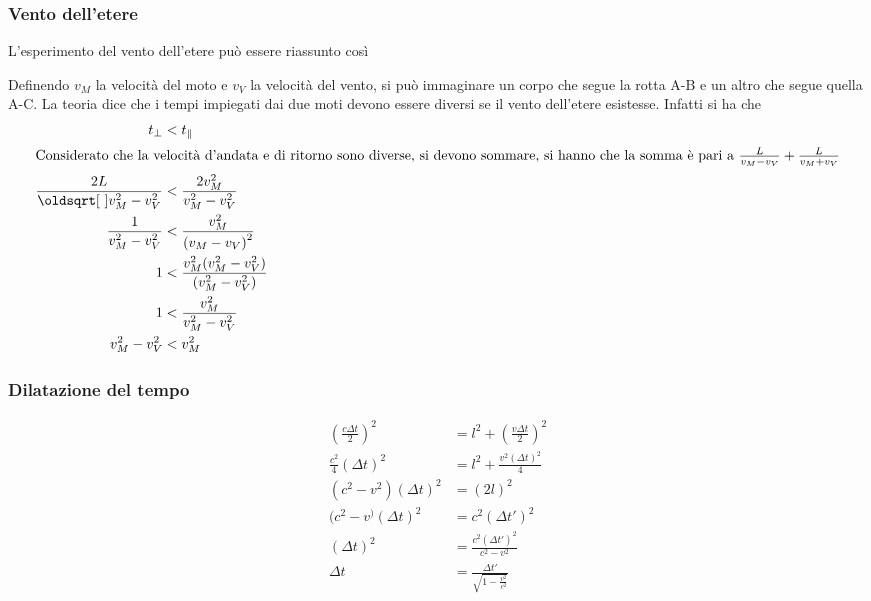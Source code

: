 \subsubsection{Vento dell'etere}
L'esperimento del vento dell'etere può essere riassunto così
\begin{center}
\end{center}
Definendo $v_M$ la velocità del moto e $v_V$ la velocità del vento, si può immaginare un corpo che
segue la rotta A-B e un altro che segue quella A-C. La teoria dice che i tempi impiegati dai due 
moti devono essere diversi se il vento dell'etere esistesse. Infatti si ha che
\begin{align*}
  t_\perp&<t_\|\\
  \intertext{Considerato che la velocità d'andata e di ritorno sono diverse, si devono sommare, si
  hanno che la somma è pari a $\frac{L}{v_M-v_V} + \frac{L}{v_M+v_V}$}
  \frac{2L}{\sqrt{v_M^2-v_V^2}}&<\frac{2v_M^2}{v_M^2-v_V^2}\\
  \frac{1}{v_M^2-v_V^2}&<\frac{v_M^2}{{(v_M-v_V)}^2}\\
  1&<\frac{v_M^2(v_M^2-v_V^2)}{(v_M^2-v_V^2)}\\
  1&<\frac{v_M^2}{v_M^2-v_V^2}\\
  v_M^2-v_V^2&<v_M^2
\end{align*}

\subsubsection{Dilatazione del tempo}
\begin{align*}
  {\left( \frac{c\Delta t}{2} \right)}^2&=l^2+{\left( \frac{v\Delta t}{2} \right)}^2\\
  \frac{c^2}{4}{(\Delta t)}^2&=l^2+\frac{v^2{(\Delta t)}^2}{4}\\
  (c^2-v^2){(\Delta t)}^2&={(2l)}^2\\
  (c^2-v^){(\Delta t)}^2 &= c^2{(\Delta t')}^2\\
  {(\Delta t)}^2&= \frac{c^2{(\Delta t')}^2}{c^2-v^2}\\
  \Delta t &= \frac{\Delta t'}{\sqrt{1-\frac{v^2}{c^2}}}
\end{align*}

